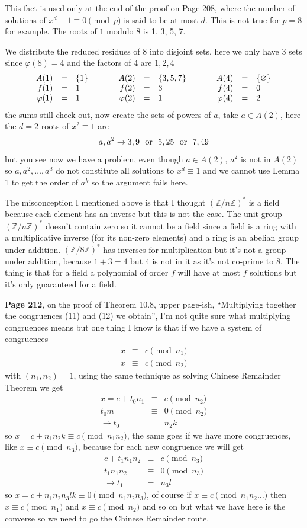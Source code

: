 \documentclass[aps,preprint,preprintnumbers,nofootinbib,showpacs,prd]{revtex4-1}
\newcommand{\nbea}{\begin{eqnarray*}}
\newcommand{\neea}{\end{eqnarray*}}
\begin{document}
This fact is used only at the end of the proof on Page 208, where the number of solutions of $x^d - 1 \equiv 0 \pmod{p}$ is said to be at most $d$. This is not true for $p=8$ for example. The roots of $1$ modulo 8 is 1, 3, 5, 7.

We distribute the reduced residues of 8 into disjoint sets, here we only have 3 sets since $\varphi(8) = 4$ and the factors of $4$ are $1, 2, 4$
%
\nbea
\begin{array}{r c l c r c l c r c l}
A(1) & = & \{1\} & ~~~~~ & A(2) & = & \{3,5,7\} & ~~~~~ & A(4) & = & \{\varnothing\} \\
f(1) & = & 1 & ~~~~~ & f(2) & = & 3 & ~~~~~ & f(4) & = & 0 \\
\varphi(1) & = & 1 & ~~~~~ & \varphi(2) & = & 1 & ~~~~~ & \varphi(4) & = & 2
\end{array}
\neea
%
the sums still check out, now create the sets of powers of $a$, take $a \in A(2)$, here the $d=2$ roots of $x^2 \equiv 1$ are
%
\nbea
a, a^2 \to 3, 9 ~~{\rm or} ~~ 5,25 ~~{\rm or} ~~ 7,49
\neea
%
but you see now we have a problem, even though $a \in A(2)$, $a^2$ is not in $A(2)$ so $a, a^2, \dots, a^d$ do not constitute all solutions to $x^d \equiv 1$ and we cannot use Lemma 1 to get the order of $a^k$ so the argument fails here.

The misconception I mentioned above is that I thought $(\mathbb{Z}/n\mathbb{Z})^*$ is a field because each element has an inverse but this is not the case. The unit group $(\mathbb{Z}/n\mathbb{Z})^*$ doesn't contain zero so it cannot be a field since a field is a ring with a multiplicative inverse (for its non-zero elements) and a ring is an abelian group under addition. $(\mathbb{Z}/8\mathbb{Z})^*$ has inverses for multiplication but it's not a group under addition, because $1+3=4$ but 4 is not in it as it's not co-prime to 8. The thing is that for a field a polynomial of order $f$ will have at most $f$ solutions but it's only guaranteed for a field.

{\bf Page 212}, on the proof of Theorem 10.8, upper page-ish, ``Multiplying together the congruences (11) and (12) we obtain'', I'm not quite sure what multiplying congruences means but one thing I know is that if we have a system of congruences
%
\nbea
x & \equiv & c \pmod{n_1} \\
x & \equiv & c \pmod{n_2}
\neea
%
with $(n_1,n_2)=1$, using the same technique as solving Chinese Remainder Theorem we get
%
\nbea
x = c + t_0n_1 & \equiv & c \pmod{n_2} \\
t_0m & \equiv & 0 \pmod{n_2} \\
\to t_0 & = & n_2k
\neea
%
so $x =c + n_1n_2k \equiv c \pmod{n_1n_2}$, the same goes if we have more congruences, like $x \equiv c \pmod{n_3}$, because for each new congruence we will get
%
\nbea
c + t_1n_1n_2 & \equiv & c \pmod{n_3} \\
t_1n_1n_2 & \equiv & 0 \pmod{n_3} \\
\to t_1 & = & n_3 l
\neea
%
so $x = c + n_1n_2n_3lk \equiv 0 \pmod{n_1n_2n_3}$, of course if $x \equiv c \pmod{n_1n_2\dots}$ then $x \equiv c \pmod{n_1}$ and $x \equiv c \pmod{n_2}$ and so on but what we have here is the converse so we need to go the Chinese Remainder route.
\end{document}
